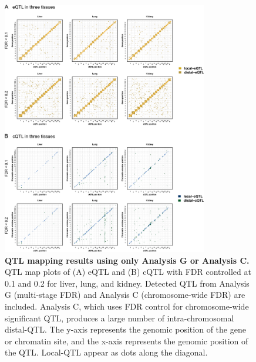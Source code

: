 \documentclass[10pt,letterpaper,twoside]{article}
\begin{document}
\clearpage

\begin{figure}[hp]
\renewcommand{\familydefault}{\sfdefault}\normalfont
\centering
\includegraphics[width=0.8\textwidth, trim={0in 0in 0in 0in}, clip]{figs/qtl_map_supplemental.png}
\caption{\textbf{QTL mapping results using only Analysis G or Analysis C.} 
QTL map plots of (A) eQTL and (B) cQTL with FDR controlled at 0.1 and 0.2 for liver, lung, and kidney. Detected QTL from Analysis G (multi-stage FDR) and Analysis C (chromosome-wide FDR) are included. Analysis C, which uses FDR control for chromosome-wide significant QTL, produces a large number of intra-chromosomal distal-QTL. The y-axis represents the genomic position of the gene or chromatin site, and the x-axis represents the genomic position of the QTL. Local-QTL appear as dots along the diagonal.
\label{fig:grid_fdr_plot}}
\end{figure}

\clearpage
\end{document}
